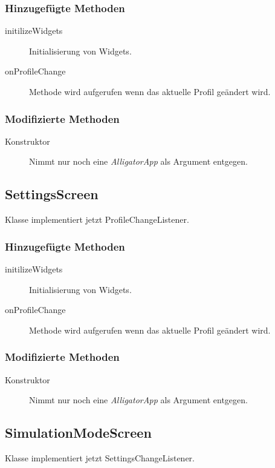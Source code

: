 \subsubsection{Hinzugefügte Methoden}
\begin{description}
\item[initilizeWidgets]
Initialisierung von Widgets.
\item[onProfileChange]
Methode wird aufgerufen wenn das aktuelle Profil geändert wird.

\end{description}

\subsubsection{Modifizierte Methoden}
\begin{description}
\item[Konstruktor]
Nimmt nur noch eine \emph{AlligatorApp} als Argument entgegen.

\end{description}


\subsection{SettingsScreen}
Klasse implementiert jetzt ProfileChangeListener.
\subsubsection{Hinzugefügte Methoden}
\begin{description}
\item[initilizeWidgets]
Initialisierung von Widgets.
\item[onProfileChange]
Methode wird aufgerufen wenn das aktuelle Profil geändert wird.


\end{description}

\subsubsection{Modifizierte Methoden}
\begin{description}
\item[Konstruktor]
Nimmt nur noch eine \emph{AlligatorApp} als Argument entgegen.

\end{description}


\subsection{SimulationModeScreen}
Klasse implementiert jetzt SettingsChangeListener.
